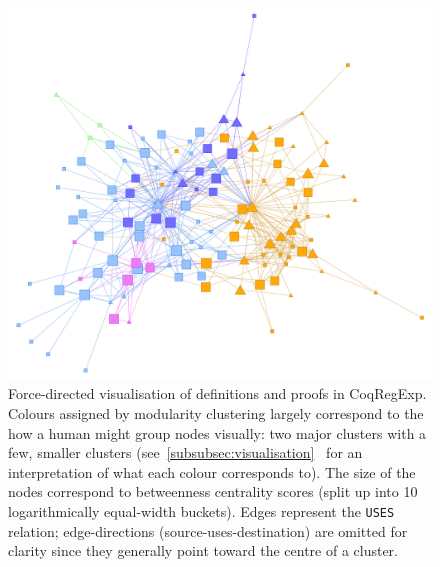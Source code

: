 \begin{figure}[tp]
\centering
\includegraphics[height=0.3\textheight]{img/regexp/direct.png}
\caption{Force-directed visualisation of definitions and proofs in CoqRegExp.
  Colours assigned by modularity clustering largely correspond to the how a
  human might group nodes visually: two major clusters with a few, smaller
  clusters (see~\ref{subsubsec:visualisation}~
  for an interpretation of what each colour corresponds to). The size of the
  nodes correspond to betweenness centrality scores (split up into 10
  logarithmically equal-width buckets). Edges represent the \texttt{USES}
  relation; edge-directions (source-uses-destination) are omitted for clarity
  since they generally point toward the centre of a
  cluster.}\label{fig:regexp:direct}
\end{figure}

